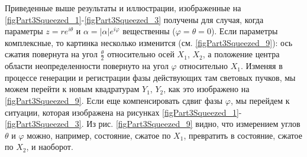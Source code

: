 Приведенные выше результаты и иллюстрации, изображенные на
\autoref{figPart3Squeezed_1}-\ref{figPart3Squeezed_3} получены для
случая, когда параметры $z = r e^{i\theta}$ и $\alpha =
\left|\alpha\right|e^{i \varphi}$ вещественны ($\varphi = \theta =
0$). Если параметры комплексные, то картинка несколько изменится
(см. \autoref{figPart3Squeezed_9}): ось сжатия повернута на угол $\frac{\theta}{2}$
относительно осей $X_1$, $X_2$, а положение центра области
неопределенности повернуто на угол $\varphi$ относительно
$X_1$. Изменяя в процессе генерации и регистрации фазы действующих там
световых пучков, мы можем перейти к новым квадратурам $Y_1$, $Y_2$, как
это изображено на \autoref{figPart3Squeezed_9}. Если еще компенсировать сдвиг фазы
$\varphi$, мы перейдем к ситуации, которая изображена на рисунках 
\ref{figPart3Squeezed_1}-\ref{figPart3Squeezed_3}. Из рис. 
\ref{figPart3Squeezed_9} видно, что измерением углов $\theta$ и
$\varphi$ можно, например, состояние, сжатое по $X_1$, превратить в
состояние, сжатое по $X_2$, и наоборот.
